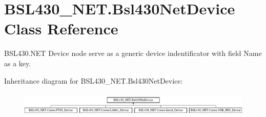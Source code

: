 \hypertarget{class_b_s_l430___n_e_t_1_1_bsl430_net_device}{}\section{B\+S\+L430\+\_\+\+N\+E\+T.\+Bsl430\+Net\+Device Class Reference}
\label{class_b_s_l430___n_e_t_1_1_bsl430_net_device}


B\+S\+L430.\+N\+ET Device node serve as a generic device indentificator with field \textquotesingle{}Name\textquotesingle{} as a key.  


Inheritance diagram for B\+S\+L430\+\_\+\+N\+E\+T.\+Bsl430\+Net\+Device\+:\begin{figure}[H]
\begin{center}
\leavevmode
\includegraphics[height=1.186441cm]{class_b_s_l430___n_e_t_1_1_bsl430_net_device}
\end{center}
\end{figure}
